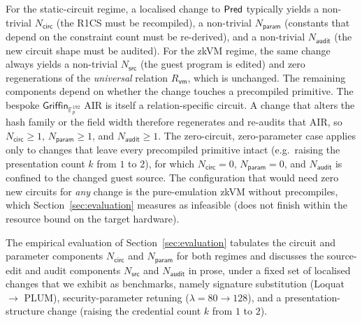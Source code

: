 For the static-circuit regime, a localised change to $\mathsf{Pred}$ typically yields a non-trivial $N_{\mathsf{circ}}$ (the R1CS must be recompiled), a non-trivial $N_{\mathsf{param}}$ (constants that depend on the constraint count must be re-derived), and a non-trivial $N_{\mathsf{audit}}$ (the new circuit shape must be audited).
For the zkVM regime, the same change always yields a non-trivial $N_{\mathsf{src}}$ (the guest program is edited) and zero regenerations of the \emph{universal} relation $R_{\mathsf{vm}}$, which is unchanged. The remaining components depend on whether the change touches a precompiled primitive. The bespoke $\mathsf{Griffin}_{\mathbb{F}_p^{192}}$ AIR is itself a relation-specific circuit. A change that alters the hash family or the field width therefore regenerates and re-audits that AIR, so $N_{\mathsf{circ}}\ge 1$, $N_{\mathsf{param}}\ge 1$, and $N_{\mathsf{audit}}\ge 1$. The zero-circuit, zero-parameter case applies only to changes that leave every precompiled primitive intact (e.g.\ raising the presentation count $k$ from $1$ to $2$), for which $N_{\mathsf{circ}}=0$, $N_{\mathsf{param}}=0$, and $N_{\mathsf{audit}}$ is confined to the changed guest source. The configuration that would need zero new circuits for \emph{any} change is the pure-emulation zkVM without precompiles, which Section~\ref{sec:evaluation} measures as infeasible (does not finish within the resource bound on the target hardware).

The empirical evaluation of Section~\ref{sec:evaluation} tabulates the circuit and parameter components $N_{\mathsf{circ}}$ and $N_{\mathsf{param}}$ for both regimes and discusses the source-edit and audit components $N_{\mathsf{src}}$ and $N_{\mathsf{audit}}$ in prose, under a fixed set of localised changes that we exhibit as benchmarks, namely signature substitution (Loquat $\to$ PLUM), security-parameter retuning ($\lambda=80\to128$), and a presentation-structure change (raising the credential count $k$ from $1$ to $2$).

